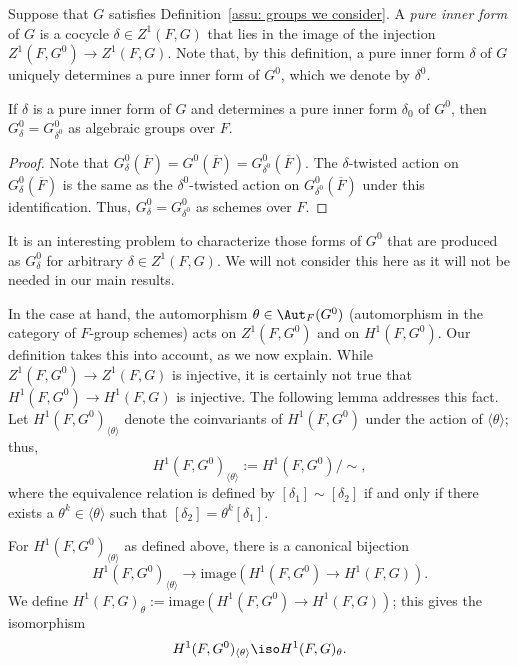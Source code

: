 \documentclass[11pt,letterpaper]{amsart}
\numberwithin{equation}{section}
\begin{document}
\begin{definition}\label{definition: pure inner form}
    Suppose that $G$ satisfies Definition~\ref{assu: groups we consider}.
    A {\it pure inner form} of $G$ is a cocycle $\delta \in Z^1(F,G)$ that lies in the image of the injection $Z^1(F,G^0) \to Z^1(F,G)$. Note that, by this definition, a pure inner form $\delta$ of $G$ uniquely determines a pure inner form of $G^0$, which we denote by $\delta^0$.
\end{definition}

\begin{lemma}
If $\delta$ is a pure inner form of $G$ and determines a pure inner form $\delta_0$ of $G^0$, then $G_\delta^0 = G^0_{\delta^0}$ as algebraic groups over $F$. 
\end{lemma}
\begin{proof}
    Note that $G_\delta^0(\overline{F})= G^0(\overline{F})= G^0_{\delta^0}(\overline{F})$. The $\delta$-twisted action on $G_\delta^0(\overline{F})$ is the same as the $\delta^0$-twisted action on $G^0_{\delta^0}(\overline{F})$ under this identification. Thus, $G_\delta^0 = G^0_{\delta^0}$ as schemes over $F$. 
\end{proof}


\begin{remark}
    It is an interesting problem to characterize those forms of $G^0$ that are produced as $G_{\delta}^0$ for arbitrary $\delta\in Z^1(F,G)$. We will not consider this here as it will not be needed in our main results.
\end{remark}





In the case at hand, the automorphism $\theta\in \Aut_F(G^0)$ (automorphism in the category of $F$-group schemes) acts on $Z^1(F,G^0)$ and on $H^1(F,G^0)$.
Our definition takes this into account, as we now explain.
While $Z^1(F,G^0)\to Z^1(F,G)$ is injective, it is certainly not true that $H^1(F,G^0)\to H^1(F,G)$ is injective.
The following lemma addresses this fact. 
Let $H^1(F,G^0)_{\langle\theta\rangle}$ denote the coinvariants of $H^1(F,G^0)$ under the action of $\langle\theta\rangle$; thus, 
\[
H^1(F,G^0)_{\langle\theta\rangle}:= H^1(F,G^0)/\sim,
\]
where the equivalence relation is defined by $[\delta_1] \sim [\delta_2]$ if and only if there exists a $\theta^k \in \langle \theta \rangle$ such that $[\delta_2]= \theta^k [\delta_1]$.

\begin{lemma}\label{lem: coinvariants}
    For $H^1(F,G^0)_{\langle\theta\rangle}$ as defined above, 
    there is a canonical bijection
    \[
H^1(F,G^0)_{\langle\theta\rangle} \rightarrow \mathrm{image}(H^1(F,G^0)\to H^1(F,G)).
    \]
    We define $H^1(F,G)_{ \theta }:=\mathrm{image}(H^1(F,G^0)\to H^1(F,G))$;  this gives the isomorphism 
    \[
H^1(F,G^0)_{\langle\theta\rangle}\iso H^1(F,G)_{\theta}.
    \]
\end{lemma}
\end{document}
